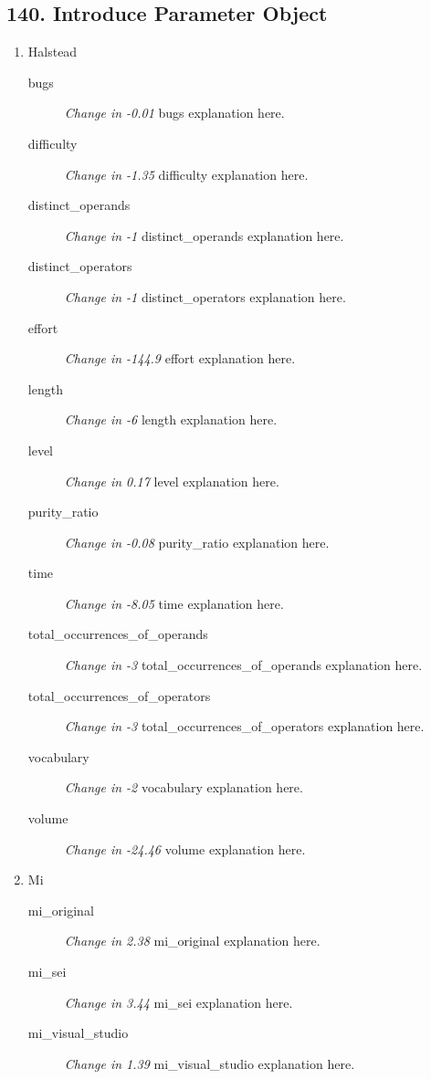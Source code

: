 \subsection{ 140.  Introduce Parameter Object }

\begin{enumerate}
  \item Halstead
        \begin{description}
          \item [bugs] \textit{Change in -0.01} bugs explanation here.
          \item [difficulty] \textit{Change in -1.35} difficulty explanation here.
          \item [distinct\_operands] \textit{Change in -1} distinct\_operands explanation here.
          \item [distinct\_operators] \textit{Change in -1} distinct\_operators explanation here.
          \item [effort] \textit{Change in -144.9} effort explanation here.
          \item [length] \textit{Change in -6} length explanation here.
          \item [level] \textit{Change in 0.17} level explanation here.
          \item [purity\_ratio] \textit{Change in -0.08} purity\_ratio explanation here.
          \item [time] \textit{Change in -8.05} time explanation here.
          \item [total\_occurrences\_of\_operands] \textit{Change in -3} total\_occurrences\_of\_operands explanation here.
          \item [total\_occurrences\_of\_operators] \textit{Change in -3} total\_occurrences\_of\_operators explanation here.
          \item [vocabulary] \textit{Change in -2} vocabulary explanation here.
          \item [volume] \textit{Change in -24.46} volume explanation here.
        \end{description}
  \item Mi
        \begin{description}
          \item [mi\_original] \textit{Change in 2.38} mi\_original explanation here.
          \item [mi\_sei] \textit{Change in 3.44} mi\_sei explanation here.
          \item [mi\_visual\_studio] \textit{Change in 1.39} mi\_visual\_studio explanation here.

\end{description}
\end{enumerate}
